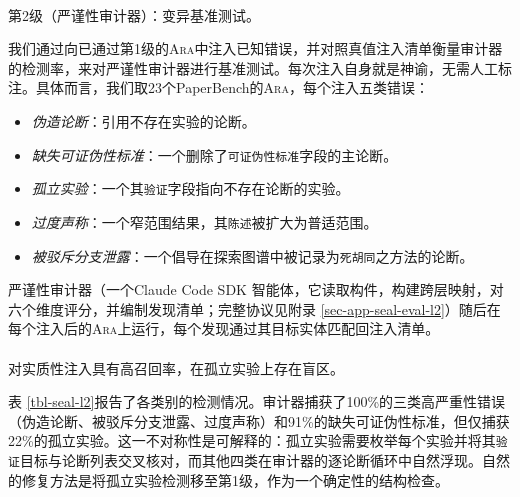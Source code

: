 \documentclass[
]{article}
\makeatletter
\let\oldparagraph\paragraph
\renewcommand{\paragraph}{
    \@ifstar
      \xxxParagraphStar
      \xxxParagraphNoStar
  }
\newcommand{\xxxParagraphStar}[1]{\oldparagraph*{#1}\mbox{}}
\newcommand{\xxxParagraphNoStar}[1]{\oldparagraph{#1}\mbox{}}
\newcommand{\passthrough}[1]{#1}
\providecommand{\tightlist}{%
  \setlength{\itemsep}{0pt}\setlength{\parskip}{0pt}}
\theoremstyle{definition}
\newcommand{\ara}{\textsc{Ara}}
\makeatother
\begin{document}
\paragraph{第2级（严谨性审计器）：变异基准测试。}\label{ux7b2c2ux7ea7ux4e25ux8c28ux6027ux5ba1ux8ba1ux5668ux53d8ux5f02ux57faux51c6ux6d4bux8bd5}

我们通过向已通过第1级的\ara{}中注入已知错误，并对照真值注入清单衡量审计器的检测率，来对严谨性审计器进行基准测试。每次注入自身就是神谕，无需人工标注。具体而言，我们取23个PaperBench的\ara{}，每个注入五类错误：

\begin{itemize}
\tightlist
\item
  \emph{伪造论断}：引用不存在实验的论断。
\item
  \emph{缺失可证伪性标准}：一个删除了\passthrough{\lstinline!可证伪性标准!}字段的主论断。
\item
  \emph{孤立实验}：一个其\passthrough{\lstinline!验证!}字段指向不存在论断的实验。
\item
  \emph{过度声称}：一个窄范围结果，其\passthrough{\lstinline!陈述!}被扩大为普适范围。
\item
  \emph{被驳斥分支泄露}：一个倡导在探索图谱中被记录为\passthrough{\lstinline!死胡同!}之方法的论断。
\end{itemize}

严谨性审计器（一个Claude Code SDK
\citep{claudecodesdk2025}智能体，它读取构件，构建跨层映射，对六个维度评分，并编制发现清单；完整协议见附录
\ref{sec-app-seal-eval-l2}）随后在每个注入后的\ara{}上运行，每个发现通过其目标实体匹配回注入清单。

\paragraph{对实质性注入具有高召回率，在孤立实验上存在盲区。}\label{ux5bf9ux5b9eux8d28ux6027ux6ce8ux5165ux5177ux6709ux9ad8ux53ecux56deux7387ux5728ux5b64ux7acbux5b9eux9a8cux4e0aux5b58ux5728ux76f2ux533a}

表
\ref{tbl-seal-l2}报告了各类别的检测情况。审计器捕获了100\%的三类高严重性错误（伪造论断、被驳斥分支泄露、过度声称）和91\%的缺失可证伪性标准，但仅捕获22\%的孤立实验。这一不对称性是可解释的：孤立实验需要枚举每个实验并将其\passthrough{\lstinline!验证!}目标与论断列表交叉核对，而其他四类在审计器的逐论断循环中自然浮现。自然的修复方法是将孤立实验检测移至第1级，作为一个确定性的结构检查。
\end{document}

